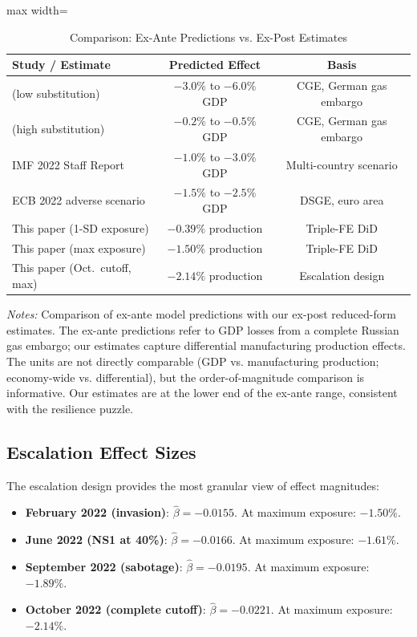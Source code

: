 \documentclass[12pt]{article}
\begin{document}
\begin{table}[htbp]
\centering
\caption{Comparison: Ex-Ante Predictions vs. Ex-Post Estimates}
\label{tab:comparison}
\begin{adjustbox}{max width=\textwidth}
\begin{tabular}{lcc}
\hline\hline
Study / Estimate & Predicted Effect & Basis \\
\hline
\citet{bachmann2022} (low substitution) & $-3.0\%$ to $-6.0\%$ GDP & CGE, German gas embargo \\
\citet{bachmann2022} (high substitution) & $-0.2\%$ to $-0.5\%$ GDP & CGE, German gas embargo \\
IMF 2022 Staff Report & $-1.0\%$ to $-3.0\%$ GDP & Multi-country scenario \\
ECB 2022 adverse scenario & $-1.5\%$ to $-2.5\%$ GDP & DSGE, euro area \\
\hline
This paper (1-SD exposure) & $-0.39\%$ production & Triple-FE DiD \\
This paper (max exposure) & $-1.50\%$ production & Triple-FE DiD \\
This paper (Oct.\ cutoff, max) & $-2.14\%$ production & Escalation design \\
\hline\hline
\end{tabular}
\end{adjustbox}
\begin{minipage}{0.85\textwidth}
\footnotesize
\textit{Notes:} Comparison of ex-ante model predictions with our ex-post reduced-form estimates. The ex-ante predictions refer to GDP losses from a complete Russian gas embargo; our estimates capture differential manufacturing production effects. The units are not directly comparable (GDP vs. manufacturing production; economy-wide vs. differential), but the order-of-magnitude comparison is informative. Our estimates are at the lower end of the ex-ante range, consistent with the resilience puzzle.
\end{minipage}
\end{table}

\subsection{Escalation Effect Sizes}

The escalation design provides the most granular view of effect magnitudes:

\begin{itemize}
    \item \textbf{February 2022 (invasion)}: $\hat{\beta} = -0.0155$. At maximum exposure: $-1.50\%$.
    \item \textbf{June 2022 (NS1 at 40\%)}: $\hat{\beta} = -0.0166$. At maximum exposure: $-1.61\%$.
    \item \textbf{September 2022 (sabotage)}: $\hat{\beta} = -0.0195$. At maximum exposure: $-1.89\%$.
    \item \textbf{October 2022 (complete cutoff)}: $\hat{\beta} = -0.0221$. At maximum exposure: $-2.14\%$.
\end{itemize}
\end{document}
